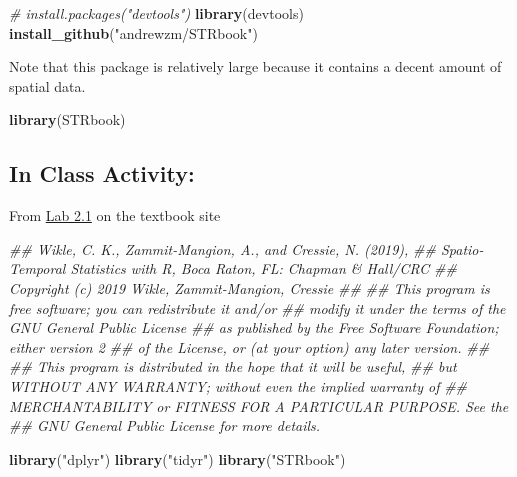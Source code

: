 \documentclass[]{book}
\newenvironment{Shaded}{\begin{snugshade}}{\end{snugshade}}
\newcommand{\CommentTok}[1]{\textcolor[rgb]{0.56,0.35,0.01}{\textit{#1}}}
\newcommand{\KeywordTok}[1]{\textcolor[rgb]{0.13,0.29,0.53}{\textbf{#1}}}
\newcommand{\NormalTok}[1]{#1}
\newcommand{\StringTok}[1]{\textcolor[rgb]{0.31,0.60,0.02}{#1}}
\begin{document}
\begin{Shaded}
\begin{Highlighting}[]
\CommentTok{# install.packages("devtools")}
\KeywordTok{library}\NormalTok{(devtools)}
\KeywordTok{install_github}\NormalTok{(}\StringTok{"andrewzm/STRbook"}\NormalTok{)}
\end{Highlighting}
\end{Shaded}

Note that this package is relatively large because it contains a decent amount of spatial data.

\begin{Shaded}
\begin{Highlighting}[]
\KeywordTok{library}\NormalTok{(STRbook)}
\end{Highlighting}
\end{Shaded}

\hypertarget{in-class-activity}{%
\subsection{In Class Activity:}\label{in-class-activity}}

From \href{https://spacetimewithr.org/code}{Lab 2.1} on the textbook site

\begin{Shaded}
\begin{Highlighting}[]
\CommentTok{## Wikle, C. K., Zammit-Mangion, A., and Cressie, N. (2019), }
\CommentTok{## Spatio-Temporal Statistics with R, Boca Raton, FL: Chapman & Hall/CRC}
\CommentTok{## Copyright (c) 2019 Wikle, Zammit-Mangion, Cressie}
\CommentTok{##}
\CommentTok{## This program is free software; you can redistribute it and/or}
\CommentTok{## modify it under the terms of the GNU General Public License}
\CommentTok{## as published by the Free Software Foundation; either version 2}
\CommentTok{## of the License, or (at your option) any later version.}
\CommentTok{##}
\CommentTok{## This program is distributed in the hope that it will be useful,}
\CommentTok{## but WITHOUT ANY WARRANTY; without even the implied warranty of}
\CommentTok{## MERCHANTABILITY or FITNESS FOR A PARTICULAR PURPOSE.  See the}
\CommentTok{## GNU General Public License for more details.}
                                        
\KeywordTok{library}\NormalTok{(}\StringTok{"dplyr"}\NormalTok{)}
\KeywordTok{library}\NormalTok{(}\StringTok{"tidyr"}\NormalTok{)}
\KeywordTok{library}\NormalTok{(}\StringTok{"STRbook"}\NormalTok{)}
\end{Highlighting}
\end{Shaded}
\end{document}
